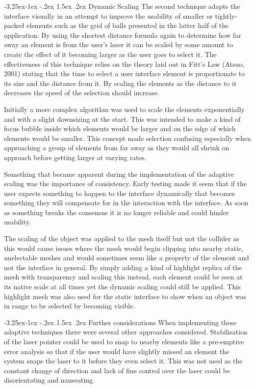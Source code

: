 \documentclass[12pt]{article}
\makeatletter
\renewcommand{\subsubsection}{\@startsection{subsubsection}{2}{\z@}%
             {-3.25ex\@plus -1ex \@minus -.2ex}%
             {1.5ex \@plus .2ex}%
             {\normalfont\normalsize\scshape\bfseries}}
\makeatother
\begin{document}
\subsubsection{Dynamic Scaling}
The second technique adapts the interface visually in an attempt to improve the usability of smaller or tightly-packed elements such as the grid of balls presented in the latter half of the application. By using the shortest distance formula again to determine how far away an element is from the user's laser it can be scaled by some amount to create the effect of it becoming larger as the user goes to select it. The effectiveness of this technique relies on the theory laid out in Fitt's Law (Atsuo, 2001) stating that the time to select a user interface element is proportionate to its size and the distance from it. By scaling the elements as the distance to it decreases the speed of the selection should increase.

Initially a more complex algorithm was used to scale the elements exponentially and with a slight downsizing at the start. This was intended to make a kind of focus bubble inside which elements would be larger and on the edge of which elements would be smaller. This concept made selection confusing especially when approaching a group of elements from far away as they would all shrink on approach before getting larger at varying rates.

Something that became apparent during the implementation of the adaptive scaling was the importance of consistency. Early testing made it seem that if the user expects something to happen to the interface dynamically that becomes something they will compensate for in the interaction with the interface. As soon as something breaks the consensus it is no longer reliable and could hinder usability.

The scaling of the object was applied to the mesh itself but not the collider as this would cause issues where the mesh would begin clipping into nearby static, unelectable meshes and would sometimes seem like a property of the element and not the interface in general. By simply adding a kind of highlight replica of the mesh with transparency and scaling this instead, each element could be seen at its native scale at all times yet the dynamic scaling could still be applied. This highlight mesh was also used for the static interface to show when an object was in range to be selected by becoming visible.

\subsubsection{Further considerations}
When implementing these adaptive techniques there were several other approaches considered. Stabilisation of the laser pointer could be used to snap to nearby elements like a pre-emptive error analysis so that if the user would have slightly missed an element the system snaps the laser to it before they even select it. This was not used as the constant change of direction and lack of fine control over the laser could be disorientating and nauseating.
\end{document}

